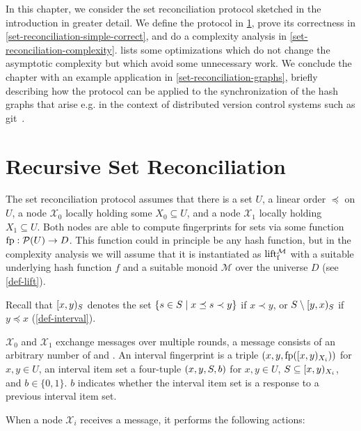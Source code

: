 
In this chapter, we consider the set reconciliation protocol sketched in the introduction in greater detail.
We define the protocol in \cref{set-reconciliation-def}, prove its correctness in \cref{set-reconciliation-simple-correct}, and do a complexity analysis in \cref{set-reconciliation-complexity}.   lists some optimizations which do not change the asymptotic complexity but which avoid some unnecessary work. We conclude the chapter with an example application in \cref{set-reconciliation-graphs}, briefly describing how the protocol can be applied to the synchronization of the hash graphs that arise e.g. in the context of distributed version control systems such as git~\cite{chacon2014pro}.

\section{Recursive Set Reconciliation}
\label{set-reconciliation-def}

The set reconciliation protocol assumes that there is a set $U$, a linear order $\preceq$ on $U$, a node $\mathcal{X}_0$ locally holding some $X_0 \subseteq U$, and a node $\mathcal{X}_1$ locally holding $X_1 \subseteq U$. Both nodes are able to compute fingerprints for sets via some function ${\operatorname{fp}}: {\mathcal{P}({U})} \rightarrow {D}$. This function could in principle be any hash function, but in the complexity analysis we will assume that it is instantiated as $\operatorname{lift_{\operatorname{f}}^{\mathcal{M}}}$ with a suitable underlying hash function $f$ and a suitable monoid $\mathcal{M}$ over the universe $D$ (see \cref{def-lift}).

Recall that $[{x},{y})_{S}$ denotes the set $\{s \in S \mid x \preceq s \prec y\}$ if $x \prec y$, or $S \setminus [{y},{x})_{S}$ if $y \preceq x$ (\cref{def-interval}).

$\mathcal{X}_0$ and $\mathcal{X}_1$ exchange messages over multiple rounds, a message consists of an arbitrary number of  and .
An interval fingerprint is a triple $({x}, {y}, {\operatorname{fp}([{x},{y})_{X_i})})$ for $x, y \in U$, an interval item set a four-tuple $({x}, {y}, {S}, {b})$ for $x, y \in U$, $S \subseteq [{x},{y})_{X_i}$, and $b \in \{0, 1\}$. $b$ indicates whether the interval item set is a response to a previous interval item set.

When a node $\mathcal{X}_i$ receives a message, it performs the following actions:

